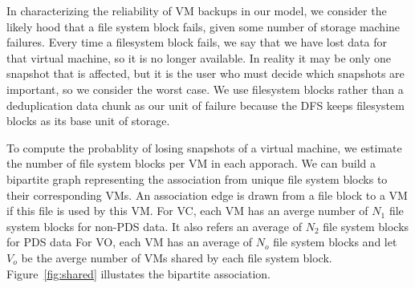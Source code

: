 


In characterizing the reliability of VM backups in our model, 
we consider the likely hood that a file system block fails,
given some number of storage machine failures. 
Every time a filesystem block fails,
we say that we have lost data for that virtual machine, so it is no longer
available. 
In reality it may be only one snapshot that is affected, but it is the user
who must decide which snapshots are important, so we consider the worst case. 
We use filesystem blocks rather than a deduplication
data chunk as our unit of failure because the DFS keeps
filesystem blocks as its base unit of storage.

To  compute the probablity of losing snapshots of a virtual machine, 
we estimate the number of file system blocks per VM in each apporach.
We can build a bipartite graph representing the association from unique file system blocks
to their corresponding VMs. An association edge is  drawn  from a file block  to a VM 
if this file is used by this VM. 
For VC, each VM has an 
averge number of $N_1$ file system blocks for non-PDS data. 
It also refers  an average of   $N_2$ file system blocks for PDS data 
For VO, each VM has an average  of  $N_o$ file system blocks
and let $V_o$ be the averge number of VMs shared by each file system block.
Figure~\ref{fig:shared} illustates the bipartite association.

